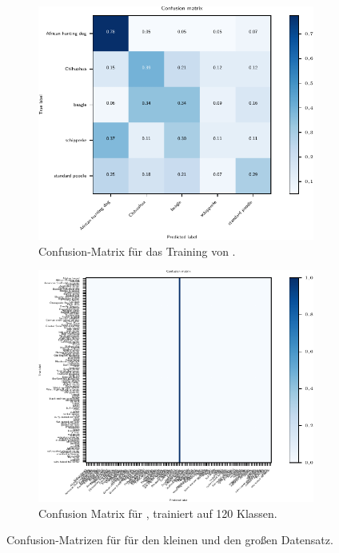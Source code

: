 \begin{figure}
  \begin{subfigure}{0.49\textwidth}
    \centering
    \includegraphics[width=\textwidth]{pics/ergebnisse/MiniDogNN/confusion_matrix}
    \caption{Confusion-Matrix für das Training von \MiniDog{}.}
    \label{fig:confusion-mini}
  \end{subfigure}
  \begin{subfigure}{0.49\textwidth}
    \centering
    \includegraphics[width=\textwidth]{pics/ergebnisse/MiniDogNN/confusion_matrix_mini120.pdf}
    \caption{Confusion Matrix für \MiniDog{}, trainiert auf 120 Klassen.}
    \label{fig:confusion-mini-120}
  \end{subfigure}
  \caption{Confusion-Matrizen für \MiniDog{} für den kleinen und den großen Datensatz.}
  \label{fig:confusion-mini-gesamt}
\end{figure}

